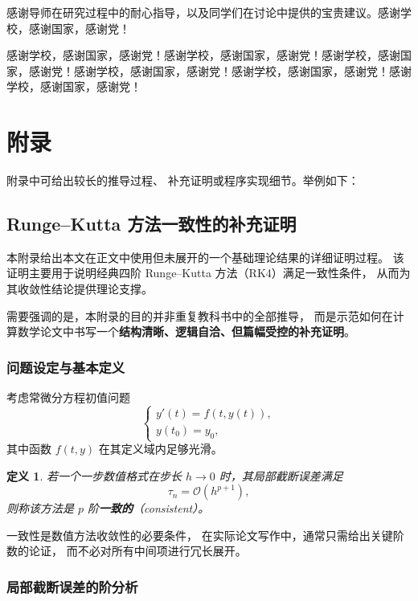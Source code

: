 \documentclass[UTF8, a4paper, zihao=-4]{ctexart} %
\newtheorem{definition}{定义}[section]
\numberwithin{equation}{section}%
\begin{document}
感谢导师在研究过程中的耐心指导，以及同学们在讨论中提供的宝贵建议。感谢学校，感谢国家，感谢党！

感谢学校，感谢国家，感谢党！感谢学校，感谢国家，感谢党！感谢学校，感谢国家，感谢党！感谢学校，感谢国家，感谢党！感谢学校，感谢国家，感谢党！感谢学校，感谢国家，感谢党！

\newpage
\section*{附\quad 录}
附录中可给出较长的推导过程、
补充证明或程序实现细节。举例如下：

\subsection*{Runge--Kutta 方法一致性的补充证明}

本附录给出本文在正文中使用但未展开的一个基础理论结果的详细证明过程。
该证明主要用于说明经典四阶 Runge--Kutta 方法（RK4）满足一致性条件，
从而为其收敛性结论提供理论支撑。

需要强调的是，本附录的目的并非重复教科书中的全部推导，
而是示范如何在计算数学论文中书写一个\textbf{结构清晰、逻辑自洽、但篇幅受控的补充证明}。

\subsubsection*{问题设定与基本定义}

考虑常微分方程初值问题
\begin{equation}
\label{eq:ivp}
\begin{cases}
y'(t) = f(t, y(t)), \\
y(t_0) = y_0,
\end{cases}
\end{equation}
其中函数 $f(t,y)$ 在其定义域内足够光滑。

\begin{definition}
若一个一步数值格式在步长 $h \to 0$ 时，其局部截断误差满足
\[
\tau_{n} = \mathcal{O}(h^{p+1}),
\]
则称该方法是 $p$ 阶\textbf{一致的}（consistent）。
\end{definition}

一致性是数值方法收敛性的必要条件，
在实际论文写作中，通常只需给出关键阶数的论证，
而不必对所有中间项进行冗长展开。

\subsubsection*{局部截断误差的阶分析}
\end{document}
